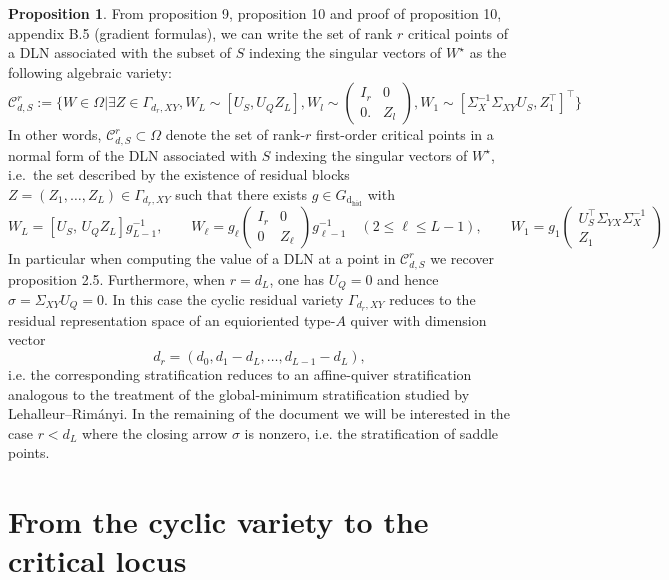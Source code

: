 \documentclass{article}
\newcommand{\dhid}{\operatorname{d_{hid}}}
\theoremstyle{definition}
\newtheorem{proposition}[theorem]{Proposition}
\begin{document}
\begin{proposition}
From \cite{achour2024loss} proposition 9, proposition 10 and proof of proposition 10, appendix B.5 (gradient formulas), we can write the set of rank $r$ critical points of a DLN associated with the subset of $S$ indexing the singular vectors of $W^{\star}$ as the following algebraic variety:
\begin{equation*}
    \mathcal{C}^r_{d,S} := \{W\in \Omega| \exists Z\in\Gamma_{d_r,XY}, W_L \sim [U_S, U_QZ_L],  W_l \sim \begin{pmatrix} I_r & 0 \\
                                                      0.  & Z_l      
                                        \end{pmatrix}, W_1 \sim [\Sigma_X^{-1}\Sigma_{XY}U_S, Z_1^{\top}]^{\top}\}
\end{equation*} 
In other words, $\mathcal{C}^r_{d,S} \subset \Omega$ denote the set of rank-$r$ first-order critical points in a normal form of the DLN associated with $S$ indexing the singular vectors of $W^{\star}$, i.e.\ the set described by the existence of residual blocks $Z = (Z_1, \dots, Z_L)\in \Gamma_{d_r,XY}$ such that there exists $g \in G_{\dhid}$ with
\[
W_L = [U_S,\, U_Q Z_L]g_{L-1}^{-1}, \qquad
W_\ell = g_\ell\begin{pmatrix} I_r & 0 \\ 0 & Z_\ell \end{pmatrix}g_{\ell-1}^{-1} \quad (2\leq \ell \leq L-1), \qquad 
W_1 = g_1\begin{pmatrix} U_S^\top \Sigma_{YX}\Sigma_X^{-1} \\ Z_1 \end{pmatrix}
\]
In particular when computing the value of a DLN at a point in $\mathcal{C}^r_{d,S}$ we recover proposition 2.5. Furthermore, when $r=d_L$, one has $U_Q=0$ and hence $\sigma=\Sigma_{XY}U_Q=0$.
In this case the cyclic residual variety $\Gamma_{d_r,XY}$ reduces to the residual
representation space of an equioriented type-$A$ quiver with dimension vector
\[
d_r = (d_0,d_1-d_L,\dots,d_{L-1}-d_L),
\]
i.e. the corresponding stratification reduces to an affine-quiver stratification analogous to the treatment of the global-minimum
stratification studied by Lehalleur--Rim\'anyi. In the remaining of the document we will be interested in the case $r<d_L$ where the closing arrow $\sigma$ is nonzero, i.e. the stratification of saddle points.
\end{proposition}
\section{From the cyclic variety to the critical locus}
\end{document}

